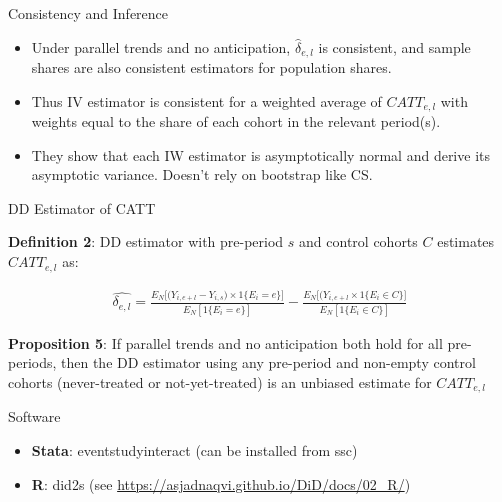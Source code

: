 \documentclass{beamer}
\begin{document}
\begin{frame}{Consistency and Inference}


\begin{itemize}
\item Under parallel trends and no anticipation, $\widehat{\delta}_{e,l}$ is consistent, and sample shares are also consistent estimators for population shares. 
\item Thus IV estimator is consistent for a weighted average of $CATT_{e,l}$ with weights equal to the share of each cohort in the relevant period(s).
\item They show that each IW estimator is asymptotically normal and derive its asymptotic variance. Doesn't rely on bootstrap like CS.
\end{itemize}

\end{frame}

\begin{frame}{DD Estimator of CATT}

\textbf{Definition 2}: DD estimator with pre-period $s$ and control cohorts $C$ estimates $CATT_{e,l}$ as:

\begin{eqnarray*}
\widehat{\delta_{e,l}} = \frac{ E_N \big [ \big ( Y_{i, e+l} - Y_{i,s} \big ) \times 1\{E_i=e\} \big ]}{E_N[1 \{E_i=e\} ]} - \frac{E_N \big [ \big ( Y_{i,e+l} \times 1 \{E_i \in C \} ]}{E_N [1 \{ E_i \in C \}]}
\end{eqnarray*}


\textbf{Proposition 5}: If parallel trends and no anticipation both hold for all pre-periods, then the DD estimator using any pre-period and non-empty control cohorts (never-treated or not-yet-treated) is an unbiased estimate for $CATT_{e,l}$

\end{frame}

\begin{frame}{Software}

\begin{itemize}
\item \textbf{Stata}: eventstudyinteract (can be installed from ssc)
\item \textbf{R}: did2s (see \url{https://asjadnaqvi.github.io/DiD/docs/02_R/})
\end{itemize}


\end{frame}
\end{document}
